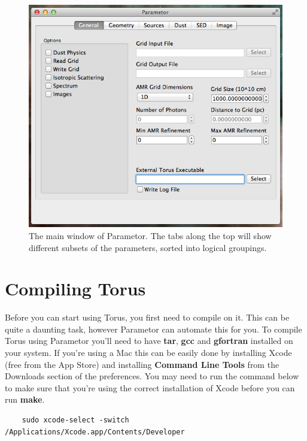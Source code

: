\documentclass[a4paper,10pt]{article}
\begin{document}
\begin{figure}
\centering
\includegraphics[width=12.5cm]{img/basics-general.png}
\caption{The main window of Parametor. The tabs along the top will show different subsets of the parameters, sorted into logical groupings.}
\label{fig:basic-general-screen}
\end{figure}

\section{Compiling Torus}
Before you can start using Torus, you first need to compile on it. This can be quite a daunting task, however Parametor can automate this for you. To compile Torus using Parametor you'll need to have \textbf{tar}, \textbf{gcc} and \textbf{gfortran} installed on your system. If you're using a Mac this can be easily done by installing Xcode (free from the App Store) and installing \textbf{Command Line Tools} from the Downloads section of the preferences. You may need to run the command below to make sure that you're using the correct installation of Xcode before you can run \textbf{make}.

\begin{verbatim}
	sudo xcode-select -switch /Applications/Xcode.app/Contents/Developer
\end{verbatim}
\end{document}

